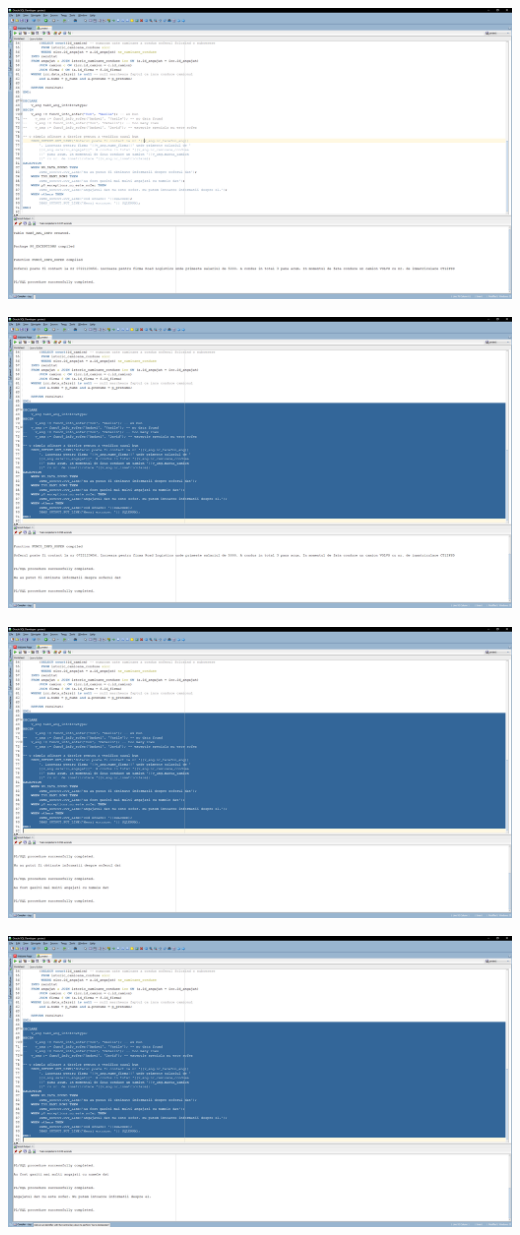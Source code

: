 \documentclass[12pt, a4paper]{article}
\begin{document}
\includegraphics[width=\textwidth]{8_1.png}

\includegraphics[width=\textwidth]{8_2.png}

\includegraphics[width=\textwidth]{8_3.png}

\includegraphics[width=\textwidth]{8_4.png}
\end{document}
